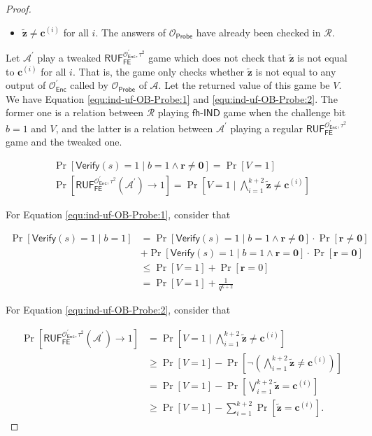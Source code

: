 \begin{proof}
\begin{itemize}
	\item $\mathbf{\tilde{z}} \neq \mathbf{c}^{(i)}$ for all $i$. The answers of $\mathcal{O}_\textsf{Probe}$ have already been checked in $\mathcal{R}$. 
\end{itemize}

Let $\mathcal{A}^\prime$ play a tweaked $\textsf{RUF}_\textsf{FE}^{\mathcal{O}^\prime_{\textsf{Enc}}, \tau^2}$ game which does not check that $\mathbf{\tilde{z}}$ is not equal to $\mathbf{c}^{(i)}$ for all $i$. That is, the game only checks whether $\mathbf{\tilde{z}}$ is not equal to any output of $\mathcal{O}^\prime_\textsf{Enc}$ called by $\mathcal{O}_\textsf{Probe}$ of $\mathcal{A}$. Let the returned value of this game be $V$. We have Equation \ref{equ:ind-uf-OB-Probe:1} and \ref{equ:ind-uf-OB-Probe:2}. The former one is a relation between $\mathcal{R}$ playing $\textsf{fh-IND}$ game when the challenge bit $b=1$ and $V$, and the latter is a relation between $\mathcal{A}^\prime$ playing a regular $\textsf{RUF}_\textsf{FE}^{\mathcal{O}^\prime_{\textsf{Enc}}, \tau^2}$ game and the tweaked one.

\begin{gather}
	\Pr[\textsf{Verify}(s) = 1 \mid b = 1 \wedge \mathbf{r} \neq \mathbf{0}] = \Pr[V = 1] \label{equ:ind-uf-OB-Probe:1} \\
	\Pr[\textsf{RUF}_\textsf{FE}^{\mathcal{O}^\prime_{\textsf{Enc}}, \tau^2}(\mathcal{A}^\prime) \to 1] = \Pr\left[ V = 1 \mid \bigwedge_{i=1}^{k+2} \mathbf{\tilde{z}} \neq \mathbf{c}^{(i)} \right] \label{equ:ind-uf-OB-Probe:2}
\end{gather}

\noindent For Equation \ref{equ:ind-uf-OB-Probe:1}, consider that

\begin{align*}
	\Pr[\textsf{Verify}(s) = 1 \mid b = 1]
	&= \Pr[\textsf{Verify}(s) = 1 \mid b = 1 \wedge \mathbf{r} \neq \mathbf{0}] \cdot \Pr[\mathbf{r} \neq \mathbf{0}] \\
	&+ \Pr[\textsf{Verify}(s) = 1 \mid b = 1 \wedge \mathbf{r} = \mathbf{0}] \cdot \Pr[\mathbf{r} = \mathbf{0}] \\
	&\leq \Pr[V = 1] + \Pr[\mathbf{r} = 0] \\
	&= \Pr[V = 1] + \frac{1}{q^{k+2}} 
\end{align*}

\noindent For Equation \ref{equ:ind-uf-OB-Probe:2}, consider that

\begin{align*}
	\Pr[\textsf{RUF}_\textsf{FE}^{\mathcal{O}^\prime_{\textsf{Enc}}, \tau^2}(\mathcal{A}^\prime) \to 1] 
	&= \Pr\left[ V = 1 \mid \bigwedge_{i=1}^{k+2} \mathbf{\tilde{z}} \neq \mathbf{c}^{(i)} \right] \\ 
	& \geq \Pr[V = 1] - \Pr \left[ \neg  \left( \bigwedge_{i=1}^{k+2} \mathbf{\tilde{z}} \neq \mathbf{c}^{(i)} \right) \right] \\
	& = \Pr[V = 1] - \Pr \left[ \bigvee_{i=1}^{k+2} \mathbf{\tilde{z}} = \mathbf{c}^{(i)} \right] \\
	& \geq \Pr[V = 1] - \sum_{i=1}^{k+2} \Pr[\mathbf{\tilde{z}} = \mathbf{c}^{(i)}].
\end{align*}


\end{proof}

